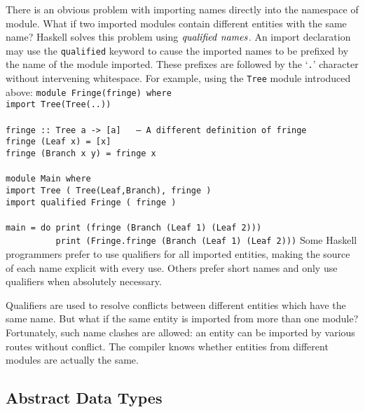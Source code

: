 There is an obvious problem with importing names directly into the
namespace of module.  What if two imported modules contain different
entities with the same name?  Haskell solves this problem using
\mbox{$\it qualified\ names$}.  An import declaration may use the
\mbox{\tt qualified} keyword to cause the imported names to be prefixed by the
name of the module imported.  These prefixes are followed by the `\mbox{\tt .}'
character without intervening whitespace.    For example, using the \mbox{\tt Tree} module introduced above:
\bprog
\mbox{\tt module\ Fringe(fringe)\ where}\\
\mbox{\tt import\ Tree(Tree(..))}\\
\mbox{\tt }\\[-8pt]
\mbox{\tt fringe\ ::\ Tree\ a\ ->\ [a]\ \ \ --\ A\ different\ definition\ of\ fringe}\\
\mbox{\tt fringe\ (Leaf\ x)\ =\ [x]}\\
\mbox{\tt fringe\ (Branch\ x\ y)\ =\ fringe\ x}\\
\mbox{\tt }\\[-8pt]
\mbox{\tt module\ Main\ where}\\
\mbox{\tt import\ Tree\ (\ Tree(Leaf,Branch),\ fringe\ )}\\
\mbox{\tt import\ qualified\ Fringe\ (\ fringe\ )\ \ }\\
\mbox{\tt }\\[-8pt]
\mbox{\tt main\ =\ do\ print\ (fringe\ (Branch\ (Leaf\ 1)\ (Leaf\ 2)))}\\
\mbox{\tt \ \ \ \ \ \ \ \ \ \ print\ (Fringe.fringe\ (Branch\ (Leaf\ 1)\ (Leaf\ 2)))}
\eprog
Some Haskell programmers prefer to use qualifiers for all imported
entities, making the source of each name explicit with every use.
Others prefer short names and only use qualifiers when absolutely
necessary.

Qualifiers are used to resolve conflicts between different entities
which have the same name.  But what if the same entity is imported
from more than one module?  Fortunately, such name clashes are
allowed: an entity can be imported by various routes without
conflict.  The compiler knows whether entities from different modules
are actually the same.

\subsection{Abstract Data Types}
\label{tut-ADTs}

